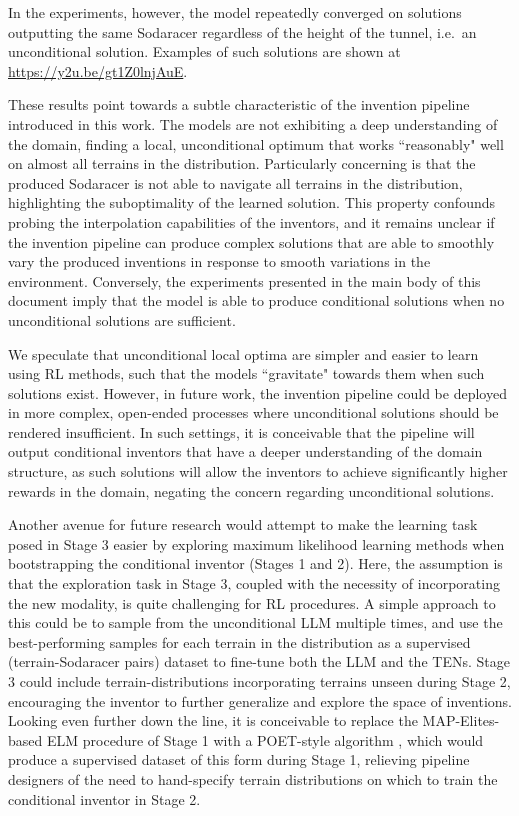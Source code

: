 \documentclass{article}
\begin{document}
In the experiments, however, the model repeatedly converged on solutions outputting the same Sodaracer regardless of the height of the tunnel, i.e.\ an unconditional solution. Examples of such solutions are shown at \url{https://y2u.be/gt1Z0lnjAuE}.%



These results point towards a subtle characteristic of the invention pipeline introduced in this work. The models are not exhibiting a deep understanding of the domain, finding a local, unconditional optimum that works ``reasonably" well on almost all terrains in the distribution. Particularly concerning is that the produced Sodaracer is not able to navigate all terrains in the distribution, highlighting the suboptimality of the learned solution. This property confounds probing the interpolation capabilities of the inventors, and it remains unclear if the invention pipeline can produce complex solutions that are able to smoothly vary the produced inventions in response to smooth variations in the environment. Conversely, the experiments presented in the main body of this document imply that the model is able to produce conditional solutions when no unconditional solutions are sufficient.

We speculate that unconditional local optima are simpler and easier to learn using RL methods, such that the models ``gravitate" towards them when such solutions exist. However, in future work, the invention pipeline could be deployed in more complex, open-ended processes where unconditional solutions should be rendered insufficient. In such settings, it is conceivable that the pipeline will output conditional inventors that have a deeper understanding of the domain structure, as such solutions will allow the inventors to achieve significantly higher rewards in the domain, negating the concern regarding unconditional solutions. 

Another avenue for future research would attempt to make the learning task posed in Stage 3 easier by exploring maximum likelihood learning methods when bootstrapping the conditional inventor (Stages 1 and 2). Here, the assumption is that the exploration task in Stage 3, coupled with the necessity of incorporating the new modality, is quite challenging for RL procedures. A simple approach to this could be to sample from the unconditional LLM multiple times, and use the best-performing samples for each terrain in the distribution as a supervised (terrain-Sodaracer pairs) dataset to fine-tune both the LLM and the TENs. Stage 3 could include terrain-distributions incorporating terrains unseen during Stage 2, encouraging the inventor to further generalize and explore the space of inventions. Looking even further down the line, it is conceivable to replace the MAP-Elites-based ELM procedure of Stage 1 with a POET-style algorithm \cite{wang2020enhanced}, which would produce a supervised dataset of this form during Stage 1, relieving pipeline designers of the need to hand-specify terrain distributions on which to train the conditional inventor in Stage 2. 
\end{document}
